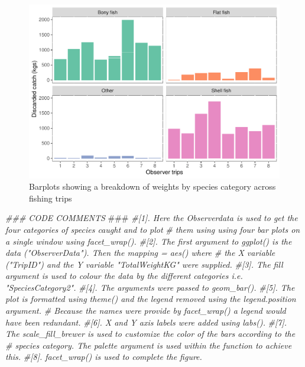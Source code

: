 \documentclass[
]{book}
\newenvironment{Shaded}{\begin{snugshade}}{\end{snugshade}}
\newcommand{\AlertTok}[1]{\textcolor[rgb]{0.94,0.16,0.16}{#1}}
\newcommand{\CommentTok}[1]{\textcolor[rgb]{0.56,0.35,0.01}{\textit{#1}}}
\begin{document}
\begin{figure}

{\centering \includegraphics{bookdown-demo_files/figure-latex/unnamed-chunk-5-1} 

}

\caption{Barplots showing a breakdown of weights by species category across fishing trips}\label{fig:unnamed-chunk-5}
\end{figure}

\begin{Shaded}
\begin{Highlighting}[]
\CommentTok{### CODE COMMENTS }\AlertTok{###}
\CommentTok{#[1]. Here the Observerdata is used to get the four categories of species caught and to plot}
\CommentTok{#     them using using four bar plots on a single window using facet_wrap().}
\CommentTok{#[2]. The first argument to ggplot() is the data ("ObserverData"). Then the mapping = aes() where}
\CommentTok{#     the X variable ("TripID") and the Y variable "TotalWeightKG" were supplied. }
\CommentTok{#[3]. The fill argument is used to colour the data by the different categories i.e. "SpeciesCategory2".}
\CommentTok{#[4]. The arguments were passed to geom_bar().}
\CommentTok{#[5]. The plot is formatted using theme() and the legend removed using the legend.position argument. }
\CommentTok{#     Because the names were provide by facet_wrap() a legend would have been redundant. }
\CommentTok{#[6]. X and Y axis labels were added using labs().}
\CommentTok{#[7]. The scale_fill_brewer is used to customize the color of the bars according to the}
\CommentTok{#     species category. The palette argument is used within the function to achieve this. }
\CommentTok{#[8]. facet_wrap() is used to complete the figure.}
\end{Highlighting}
\end{Shaded}
\end{document}

